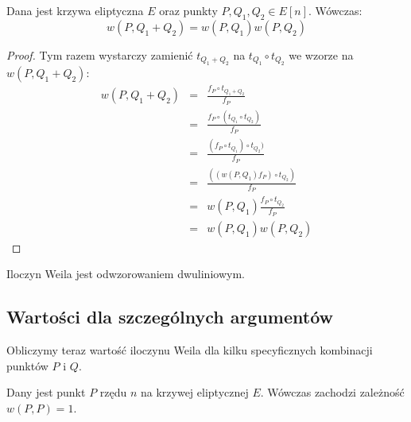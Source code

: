 \begin{lemma}
Dana jest krzywa eliptyczna $E$ oraz punkty $P, Q_1, Q_2 \in E[n]$.
Wówczas:
\begin{equation}
w(P, Q_1 + Q_2) = w(P, Q_1)w(P, Q_2)
\end{equation}
\end{lemma}

\begin{proof}
Tym razem wystarczy zamienić $t_{Q_1 + Q_2}$ na $t_{Q_1} \circ t_{Q_2}$
we wzorze na $w(P, Q_1 + Q_2)$:
\begin{eqnarray*}
w(P, Q_1 + Q_2)
& = & \frac{f_P \circ t_{Q_1 + Q_2}}{f_P} \\
& = & \frac{f_P \circ (t_{Q_1} \circ t_{Q_2})}{f_P} \\
& = & \frac{(f_P \circ t_{Q_1}) \circ t_{Q_2})}{f_P} \\
& = & \frac{((w(P,Q_1)f_P) \circ t_{Q_2})}{f_P} \\
& = & w(P, Q_1)\frac{f_P \circ t_{Q_2}}{f_P} \\
& = & w(P, Q_1)w(P, Q_2)
\end{eqnarray*}
\end{proof}

\begin{corollary}
Iloczyn Weila jest odwzorowaniem dwuliniowym.
\end{corollary}

\subsection*{Wartości dla szczególnych argumentów}

\noindent
Obliczymy teraz wartość iloczynu Weila
dla kilku specyficznych kombinacji punktów $P$ i $Q$.

\begin{theorem}
Dany jest punkt $P$ rzędu $n$ na krzywej eliptycznej $E$.
Wówczas zachodzi zależność $w(P, P) = 1$.
\end{theorem}

